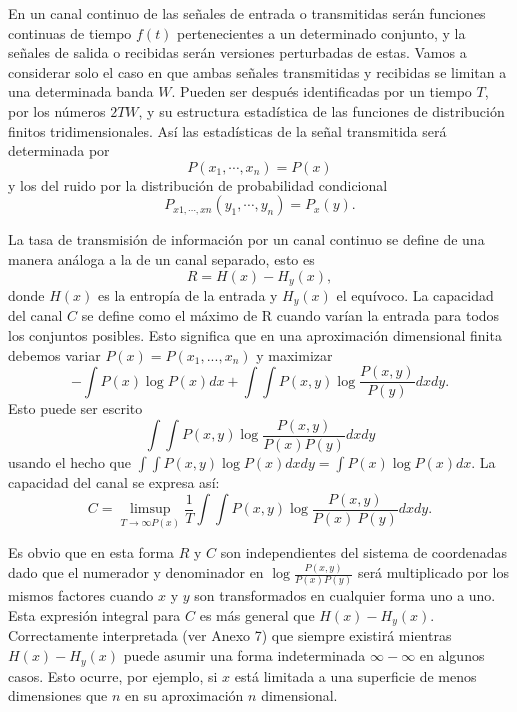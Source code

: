 	En un canal continuo de las se\~nales de entrada o
	transmitidas ser\'an funciones continuas de tiempo $f(t)$
	pertenecientes a un determinado conjunto, y la señales de
	salida o recibidas ser\'an versiones perturbadas de
	estas. Vamos a considerar solo el caso en que ambas se\~nales
	transmitidas y recibidas se limitan a una determinada banda
	$W$. Pueden ser despu\'es identificadas por un tiempo $T$, por
	los n\'umeros $2TW$, y su estructura estad\'istica de las
	funciones de distribuci\'on finitos tridimensionales. As\'i
	las estad\'isticas de la se\~nal transmitida ser\'a
	determinada por
	\begin{equation}
		P(x_{1}, \cdots ,x_{n}) = P(x)
	\end{equation}	 
	y los del ruido por la distribuci\'on de probabilidad condicional
	\begin{equation}
		P_{x1, \cdots ,xn} (y_{1}, \cdots ,y_{n}) = P_{x}(y).
	\end{equation}
	
	La tasa de transmisi\'on de informaci\'on por un canal
	continuo se define de una manera an\'aloga a la de un canal
	separado, esto es \begin{equation} R =
	H(x)-H_{y}(x), \end{equation} donde $H(x)$ es la entrop\'ia de
	la entrada y $H_{y}(x)$ el equ\'ivoco. La capacidad del canal
	$C$ se define como el m\'aximo de R cuando var\'ian la entrada
	para todos los conjuntos posibles. Esto significa que en una
	aproximaci\'on dimensional finita debemos variar $P(x) =
	P(x_{1},...,x_{n})$ y maximizar \begin{equation} - \int
	P(x) \log P(x)dx + \int\int
	P(x,y)\log \frac{P(x,y)}{P(y)}dxdy.  \end{equation} Esto puede
	ser escrito \begin{equation} \int\int
	P(x,y) \log \frac{P(x,y)}{P(x)P(y)}dxdy \end{equation} usando
	el hecho que $\int\int P(x,y)\log P(x)dxdy = \int P(x)\log
	P(x)dx$. La capacidad del canal se expresa as\'i:
	\begin{equation}
		C = \limsup_{T\to \infty P(x)} \frac{1}{T}\int\int P(x,y)\log \frac{P(x,y)}{P(x)~
		P(y)}dxdy.
	\end{equation}
	
	Es obvio que en esta forma $R$ y $C$ son independientes del
	sistema de coordenadas dado que el numerador y denominador en
	$\log\frac{P(x,y)}{P(x)P(y)}$ ser\'a multiplicado por los
	mismos factores cuando $x$ y $y$ son transformados en
	cualquier forma uno a uno. Esta expresi\'on integral para $C$
	es m\'{a}s general que $H(x)-H_{y}(x)$. Correctamente
	interpretada (ver Anexo 7) que siempre existir\'a mientras
	$H(x)-H_{y}(x)$ puede asumir una forma indeterminada $\infty
	- \infty$ en algunos casos. Esto ocurre, por ejemplo, si $x$
	est\'a limitada a una superficie de menos dimensiones que $n$
	en su aproximaci\'on $n$ dimensional.
	
